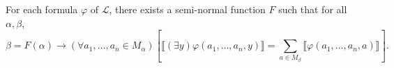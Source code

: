 For each formula $\varphi$ of $\mathcal{L}$, there exists a semi-normal function $F$ such that for all $\alpha, \beta$,
$$\beta = F(\alpha) \to (\forall a_1, \ldots, a_n \in M_{\alpha})\left[\llbracket (\exists y)\varphi(a_1, \ldots, a_n, y) \rrbracket = \sum_{a \in M_{\beta}} \llbracket \varphi(a_1, \ldots, a_n, a) \rrbracket\right].$$
